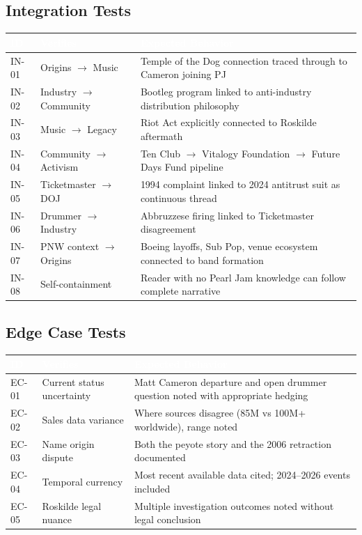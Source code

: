 \documentclass[11pt,letterpaper]{article}
\newcommand{\tableheader}[1]{\textbf{\sffamily\textcolor{white}{#1}}}
\begin{document}
\subsection{Integration Tests}

\begin{center}
\begin{tabularx}{\textwidth}{C{1.2cm}L{3.5cm}X}
\toprule
{}
\tableheader{ID} & \tableheader{Verifies} & \tableheader{Expected Behavior} \\
\midrule
IN-01 & Origins $\rightarrow$ Music & Temple of the Dog connection traced through to Cameron joining PJ \\
IN-02 & Industry $\rightarrow$ Community & Bootleg program linked to anti-industry distribution philosophy \\
IN-03 & Music $\rightarrow$ Legacy & Riot Act explicitly connected to Roskilde aftermath \\
IN-04 & Community $\rightarrow$ Activism & Ten Club $\rightarrow$ Vitalogy Foundation $\rightarrow$ Future Days Fund pipeline \\
IN-05 & Ticketmaster $\rightarrow$ DOJ & 1994 complaint linked to 2024 antitrust suit as continuous thread \\
IN-06 & Drummer $\rightarrow$ Industry & Abbruzzese firing linked to Ticketmaster disagreement \\
IN-07 & PNW context $\rightarrow$ Origins & Boeing layoffs, Sub Pop, venue ecosystem connected to band formation \\
IN-08 & Self-containment & Reader with no Pearl Jam knowledge can follow complete narrative \\
\bottomrule
\end{tabularx}
\end{center}

\subsection{Edge Case Tests}

\begin{center}
\begin{tabularx}{\textwidth}{C{1.2cm}L{3.5cm}X}
\toprule
{}
\tableheader{ID} & \tableheader{Verifies} & \tableheader{Expected Behavior} \\
\midrule
EC-01 & Current status uncertainty & Matt Cameron departure and open drummer question noted with appropriate hedging \\
EC-02 & Sales data variance & Where sources disagree (85M vs 100M+ worldwide), range noted \\
EC-03 & Name origin dispute & Both the peyote story and the 2006 retraction documented \\
EC-04 & Temporal currency & Most recent available data cited; 2024--2026 events included \\
EC-05 & Roskilde legal nuance & Multiple investigation outcomes noted without legal conclusion \\
\bottomrule
\end{tabularx}
\end{center}
\end{document}
